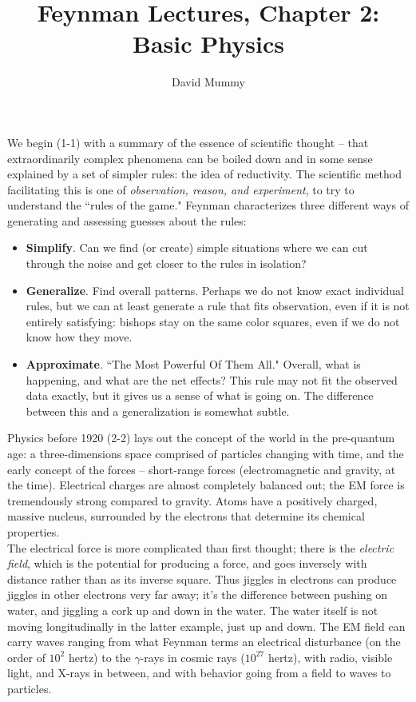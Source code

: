 \documentclass[10pt,letterpaper]{article}
\author{David Mummy}
\title{Feynman Lectures, Chapter 2: Basic Physics}
\begin{document}
\maketitle
We begin (1-1) with a summary of the essence of scientific thought -- that extraordinarily complex phenomena can be boiled down and in some sense explained by a set of simpler rules: the idea of reductivity. The scientific method facilitating this is one of \textit{observation, reason, and experiment}, to try to understand the ``rules of the game." Feynman characterizes three different ways of generating and assessing guesses about the rules:
\begin{itemize}
\item \textbf{Simplify}. Can we find (or create) simple situations where we can cut through the noise and get closer to the rules in isolation?
\item \textbf{Generalize}. Find overall patterns. Perhaps we do not know exact individual rules, but we can at least generate a rule that fits observation, even if it is not entirely satisfying: bishops stay on the same color squares, even if we do not know how they move. 
\item \textbf{Approximate}. ``The Most Powerful Of Them All." Overall, what is happening, and what are the net effects? This rule may not fit the observed data exactly, but it gives us a sense of what is going on. The difference between this and a generalization is somewhat subtle. 
\end{itemize}
Physics before 1920 (2-2) lays out the concept of the world in the pre-quantum age: a three-dimensions space comprised of particles changing with time, and the early concept of the forces -- short-range forces (electromagnetic and gravity, at the time). Electrical charges are almost completely balanced out; the EM force is tremendously strong compared to gravity. Atoms have a positively charged, massive nucleus, surrounded by the electrons that determine its chemical properties. \\
\indent The electrical force is more complicated than first thought; there is the \textit{electric field}, which is the potential for producing a force, and goes inversely with distance rather than as its inverse square. Thus jiggles in electrons can produce jiggles in other electrons very far away; it's the difference between pushing on water, and jiggling a cork up and down in the water. The water itself is not moving longitudinally in the latter example, just up and down. 
\indent The EM field can carry waves ranging from what Feynman terms an electrical disturbance (on the order of  $10^2$ hertz) to the $\gamma $-rays in cosmic rays ($10^27$ hertz), with radio, visible light, and X-rays in between, and with behavior going from a field to waves to particles. \\
\end{document}
